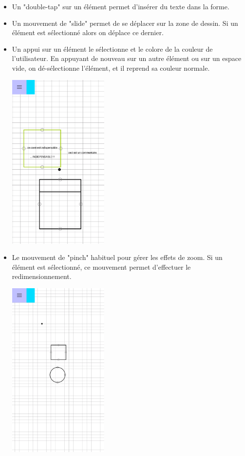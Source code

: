 \begin{itemize}
\begin{minipage}{\linewidth}
		\end{minipage}
\item Un "double-tap" sur un élément permet d'insérer du texte dans la forme.
\item Un mouvement de "slide" permet de se déplacer sur la zone de dessin. Si un élément est sélectionné alors on déplace ce dernier.
\item Un appui sur un élément le sélectionne et le colore de la couleur de l'utilisateur. En appuyant de nouveau sur un autre élément ou sur un espace vide, on dé-sélectionne l'élément, et il reprend sa couleur normale.\par
		\begin{minipage}{\linewidth}
			\centering
			\includegraphics[width=5cm]{img/screen/colladia_draw_view_element_text}
		\end{minipage}
\item Le mouvement de "pinch" habituel pour gérer les effets de zoom. Si un élément est sélectionné, ce mouvement permet d'effectuer le redimensionnement.\par
		\begin{minipage}{\linewidth}
			\centering
			\includegraphics[width=5cm]{img/screen/colladia_draw_view_zoom_out}

\end{minipage}
\end{itemize}
